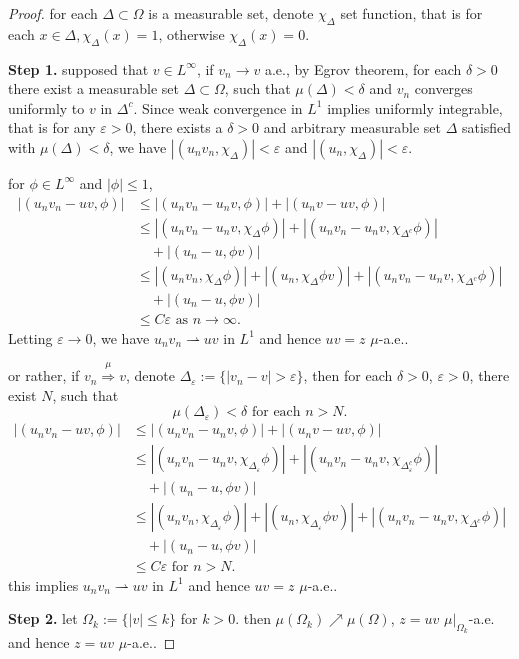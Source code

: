 \begin{proof}
for each $\Delta\subset\Omega$ is a measurable set, denote $\chi_\Delta$ set function, that is for each $x\in\Delta, \chi_\Delta(x) = 1$, otherwise $\chi_\Delta(x)=0$.

\textbf{Step 1.} supposed that $v\in L^\infty$,
if $v_n\rightarrow v$ a.e., by Egrov theorem, for each $\delta > 0$ there exist a 
measurable set $\Delta\subset\Omega$, such that $\mu(\Delta) < \delta$ and $v_n$ converges uniformly to $v$ in $\Delta^c$. Since weak convergence in $L^1$ implies uniformly integrable, that is for any $\varepsilon > 0$, there exists a $\delta>0$ and arbitrary measurable set $\Delta$ satisfied with $\mu(\Delta) < \delta$, we have $|(u_nv_n, \chi_\Delta)| < \varepsilon$ and $|(u_n, \chi_{\Delta})| < \varepsilon$.

for $\phi\in L^\infty$ and $|\phi|\leqslant1$, 
\begin{equation*}
\begin{split}
|(u_nv_n - uv, \phi)| & \leqslant |(u_nv_n - u_nv, \phi)| + |(u_nv - uv, \phi)|\\
&\leqslant |(u_nv_n - u_nv, \chi_\Delta\phi)| + |(u_nv_n - u_nv, \chi_{\Delta^c}\phi)| \\
&\quad + |(u_n - u, \phi v)|\\
&\leqslant |(u_nv_n, \chi_\Delta\phi)| + |(u_n, \chi_\Delta\phi v)| + |(u_nv_n - u_nv, \chi_{\Delta^c}\phi)| \\
&\quad+ |(u_n - u, \phi v)|\\
&\leqslant C\varepsilon \text{ as } n\rightarrow\infty.
\end{split}
\end{equation*}
Letting $\varepsilon\rightarrow0$, we have $u_nv_n\rightharpoonup uv$ in $L^1$ and hence 
$uv=z$ $\mu$-a.e..

or rather, if $v_n\stackrel{\mu}{\Longrightarrow}v$, denote $\Delta_\varepsilon:=\{|v_n - v| >\varepsilon\}$, then for each $\delta>0$, $ \varepsilon>0$, there exist $N$, such that  $$\mu(\Delta_\varepsilon) < \delta \text{ for each } n > N.$$
\begin{equation*}
\begin{split}
|(u_nv_n - uv, \phi)| & \leqslant |(u_nv_n - u_nv, \phi)| + |(u_nv - uv, \phi)|\\
&\leqslant |(u_nv_n - u_nv, \chi_{\Delta_\varepsilon}\phi)| + |(u_nv_n - u_nv, \chi_{\Delta_\varepsilon^c}\phi)| \\
&\quad + |(u_n - u, \phi v)|\\
&\leqslant |(u_nv_n, \chi_{\Delta_\varepsilon}\phi)| + |(u_n, \chi_{\Delta_\varepsilon}\phi v)| + |(u_nv_n - u_nv, \chi_{\Delta^c}\phi)| \\
&\quad+ |(u_n - u, \phi v)|\\
&\leqslant C\varepsilon \text{ for } n > N.
\end{split}
\end{equation*}
this implies $u_nv_n\rightharpoonup uv$ in $L^1$ and hence 
$uv=z$ $\mu$-a.e..

\textbf{Step 2.} let $\Omega_k:= \{|v|\leqslant k\}$ for $k > 0$. then $\mu(\Omega_k)\nearrow\mu(\Omega)$, $z=uv$ $\mu|_{\Omega_k}$-a.e. and hence $z=uv$ $\mu$-a.e.. 
\end{proof}

